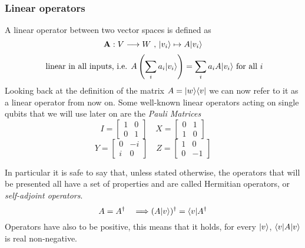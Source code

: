 	\subsubsection*{Linear operators}
	A linear operator between two vector spaces is defined as 
	$$ \mathbf{A}: V\longrightarrow W \text{  ,  }|v_i \rangle\mapsto A|v_i \rangle$$
	$$ \text{ linear in all inputs, i.e.  }  A\left( \sum_i a_i|v_i \rangle\right) = \sum_i a_i A|v_i \rangle \text{  for all } i $$ 
	Looking back at the definition of the matrix $ A = |w \rangle\langle v|$ we can now refer to it as a linear operator from now on.
	Some well-known linear operators acting on single qubits that we will use later on are the \textit{Pauli Matrices}
	$$ I = \begin{bmatrix} 1 & 0 \\ 0 & 1 \end{bmatrix}	 \quad   X = \begin{bmatrix} 0 & 1 \\ 1 & 0 \end{bmatrix}$$
	$$ Y= \begin{bmatrix} 0 & -i \\ i & 0 \end{bmatrix}	 \quad   Z = \begin{bmatrix} 1 & 0 \\ 0 & -1 \end{bmatrix}$$
	
	In particular it is safe to say that, unless stated otherwise, the operators that will be presented all have a set of properties and are called Hermitian operators, or \emph{self-adjoint operators}.
	$$ A = A^{\dagger} \quad \Longrightarrow (A|v \rangle)^{\dagger} = \langle v|A^{\dagger} $$ 
	Operators have also to be positive, this means that it holds, for every $|v \rangle$, $\langle v|A|v \rangle$ is real non-negative. 
 
